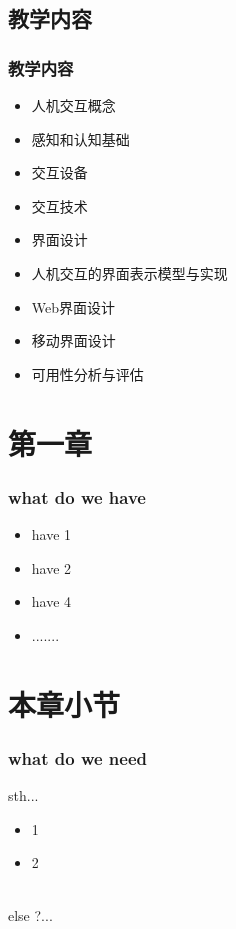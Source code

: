 \documentclass{beamer}
\begin{document}
\subsection{教学内容}
\begin{frame}
	\frametitle{教学内容}
	\begin{itemize}[<+-|alert@+>]
		\item 人机交互概念
		\item 感知和认知基础
		\item 交互设备
		\item 交互技术
		\item 界面设计 
		\item 人机交互的界面表示模型与实现
		\item Web界面设计
		\item 移动界面设计
		\item 可用性分析与评估
	\end{itemize}
\end{frame}

\section{第一章}
 
\begin{frame}
	\frametitle{what do we have}
	\begin{itemize}[<+-|alert@+>]
		\item have 1
		\item have 2
		\item have 4
		\item .......
	\end{itemize}
\end{frame}
 
\section{本章小节}
\begin{frame}
	\frametitle{what do we need}
	sth...
	\begin{itemize}[<+-|alert@+>]
		\item 1
		\item 2
	\end{itemize} 
	\hfill \\
	else ?...
\end{frame}
 
\end{document}
